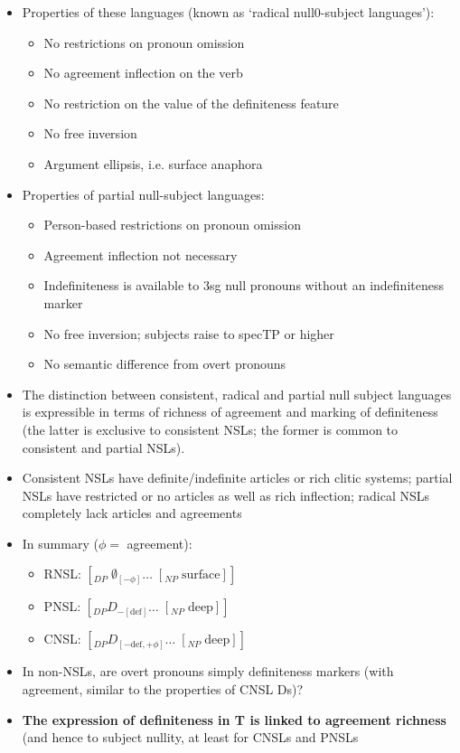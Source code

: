 \documentclass{article}
\begin{document}
\begin{itemize}
    \item Properties of these languages (known as `radical null0-subject languages'):
    \begin{itemize}
        \item No restrictions on pronoun omission
        \item No agreement inflection on the verb
        \item No restriction on the value of the definiteness feature
        \item No free inversion
        \item Argument ellipsis, i.e. surface anaphora
    \end{itemize}
    \item Properties of partial null-subject languages:
    \begin{itemize}
        \item Person-based restrictions on pronoun omission
        \item Agreement inflection not necessary
        \item Indefiniteness is available to 3sg null pronouns without an indefiniteness marker
        \item No free inversion; subjects raise to specTP or higher
        \item No semantic difference from overt pronouns
    \end{itemize}
    \item The distinction between consistent, radical and partial null subject languages is expressible in terms of richness of agreement and marking of definiteness (the latter is exclusive to consistent NSLs; the former is common to consistent and partial NSLs).
    \item Consistent NSLs have definite/indefinite articles or rich clitic systems; partial NSLs have restricted or no articles as well as rich inflection; radical NSLs completely lack articles and agreements
    \item In summary ($\phi =$ agreement):
    \begin{itemize}
        \item RNSL: $[_{DP} \; \emptyset_{[-\phi]} \ldots \; [_{NP} \; \text{surface}]]$
        \item PNSL: $[_{DP} D_{-[\text{def}]} \ldots \; [_{NP} \; \text{deep} ]]$
        \item CNSL: $[_{DP} D_{[-\text{def}, +\phi]} \ldots \; [_{NP} \; \text{deep} ]]$
    \end{itemize}
    \item In non-NSLs, are overt pronouns simply definiteness markers (with agreement, similar to the properties of CNSL Ds)?
    \item \textbf{The expression of definiteness in T is linked to agreement richness} (and hence to subject nullity, at least for CNSLs and PNSLs
\end{itemize}
\end{document}
